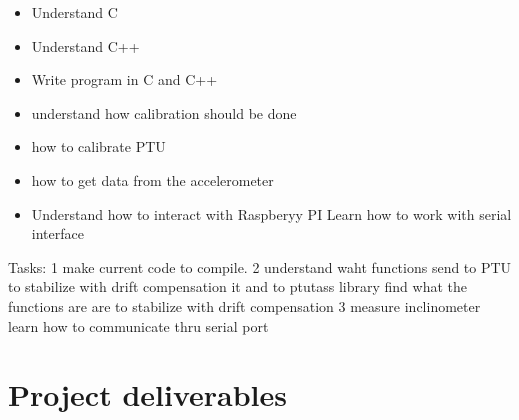 \documentclass[11pt,fleqn,twoside]{article}
\begin{document}
\begin{itemize} \itemsep1pt \parskip0pt 
\item Understand C
\item Understand C++
\item Write program in C and C++
\item understand how calibration should be done
\item how to calibrate PTU
\item how to get data from the accelerometer
\item Understand how to interact with Raspberyy  PI
Learn how to work with serial interface
\end{itemize}
 Tasks: 1 make current code to compile.
       2 understand waht functions send to PTU to stabilize with drift compensation it and to ptutass library find what the functions are are to stabilize with drift compensation
       3 measure inclinometer
       learn how to communicate thru serial port
       
\section{Project deliverables}
\end{document}
